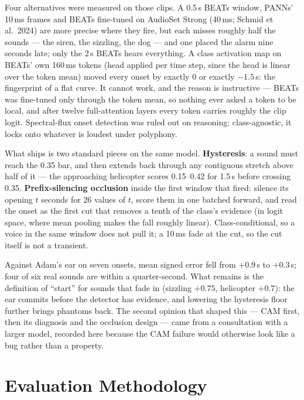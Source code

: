 \documentclass[11pt,a4paper]{article}
\begin{document}
Four alternatives were measured on those clips. A 0.5\,s BEATs window, PANNs' 10\,ms frames
and BEATs fine-tuned on AudioSet Strong (40\,ms; Schmid et al.\ 2024) are more precise where
they fire, but each misses roughly half the sounds --- the siren, the sizzling, the dog ---
and one placed the alarm nine seconds late; only the 2\,s BEATs hears everything. A class
activation map on BEATs' own 160\,ms tokens (head applied per time step, since the head is
linear over the token mean) moved every onset by exactly 0 or exactly $-1.5$\,s: the
fingerprint of a flat curve. It cannot work, and the reason is instructive --- BEATs was
fine-tuned only through the token mean, so nothing ever asked a token to be local, and after
twelve full-attention layers every token carries roughly the clip logit. Spectral-flux onset
detection was ruled out on reasoning: class-agnostic, it locks onto whatever is loudest
under polyphony.

What ships is two standard pieces on the same model. \textbf{Hysteresis}: a sound must reach
the 0.35 bar, and then extends back through any contiguous stretch above half of it ---
the approaching helicopter scores 0.15--0.42 for 1.5\,s before crossing 0.35.
\textbf{Prefix-silencing occlusion} inside the first window that fired: silence its opening
$t$ seconds for 26 values of $t$, score them in one batched forward, and read the onset as
the first cut that removes a tenth of the class's evidence (in logit space, where mean
pooling makes the fall roughly linear). Class-conditional, so a voice in the same window
does not pull it; a 10\,ms fade at the cut, so the cut itself is not a transient.

Against Adam's ear on seven onsets, mean signed error fell from $+0.9$\,s to $+0.3$\,s; four
of six real sounds are within a quarter-second. What remains is the definition of ``start''
for sounds that fade in (sizzling $+0.75$, helicopter $+0.7$): the ear commits before the
detector has evidence, and lowering the hysteresis floor further brings phantoms back. The
second opinion that shaped this --- CAM first, then its diagnosis and the occlusion design
--- came from a consultation with a larger model, recorded here because the CAM failure
would otherwise look like a bug rather than a property.

\section{Evaluation Methodology}\label{sec:eval}
\end{document}
